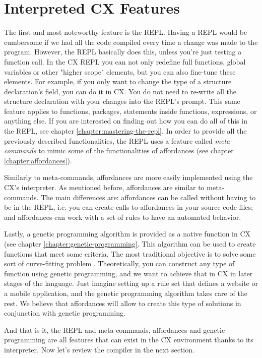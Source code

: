 \documentclass[11pt,fleqn,openany]{book} %
\begin{document}
\section{Interpreted CX Features}

The first and most noteworthy feature is the REPL. Having a REPL would be cumbersome if we had all the code compiled every time a change was made to the program. However, the REPL basically does this, unless you're just testing a function call. In the CX REPL you can not only redefine full functions, global variables or other "higher scope" elements, but you can also fine-tune these elements. For example, if you only want to change the type of a structure declaration's field, you can do it in CX. You do not need to re-write all the structure declaration with your changes into the REPL's prompt. This same feature applies to functions, packages, statements inside functions, expressions, or anything else. If you are interested on finding out how you can do all of this in the REPL, see chapter \ref{chapter:mastering-the-repl}. In order to provide all the previously described functionalities, the REPL uses a feature called \emph{meta-commands} to mimic some of the functionalities of affordances (see chapter \ref{chapter:affordances}). 

Similarly to meta-commands, affordances are more easily implemented using the CX's interpreter. As mentioned before, affordances are similar to meta-commands. The main differences are: affordances can be called without having to be in the REPL, i.e. you can create calls to affordances in your source code files; and affordances can work with a set of rules to have an automated behavior.

Lastly, a genetic programming algorithm is provided as a native function in CX (see chapter \ref{chapter:genetic-programming}. This algorithm can be used to create functions that meet some criteria. The most traditional objective is to solve some sort of curve-fitting problem \cite{lancaster1986curve}. Theoretically, you can construct any type of function using genetic programming, and we want to achieve that in CX in later stages of the language. Just imagine setting up a rule set that defines a website or a mobile application, and the genetic programming algorithm takes care of the rest. We believe that affordances will allow to create this type of solutions in conjunction with genetic programming.

And that is it, the REPL and meta-commands, affordances and genetic programming are all features that can exist in the CX environment thanks to its interpreter. Now let's review the compiler in the next section.
\end{document}
